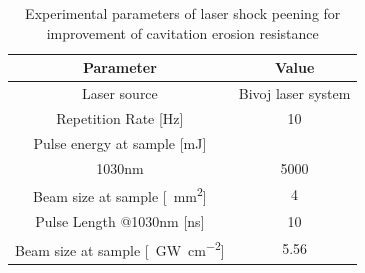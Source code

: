 \begin{table}[h!]
\centering
    \begin{threeparttable}
        \begin{tabular}{||c | c||} 
        \hline
            \textbf{Parameter} & \textbf{Value} \\ [0.5ex] 
        \hline\hline
        Laser source & Bivoj laser system  \\
        \hline
        Repetition Rate [Hz] & 10  \\ 
        \hline
            Pulse energy at sample [mJ] & \\
            1030nm & 5000 \\
        \hline
            Beam size at sample [\SI{}{\mm\squared}] & 4 \\
        \hline
            Pulse Length @1030nm [ns] & 10 \\
        \hline
            Beam size at sample [\SI{}{\giga\watt\per\cm\squared}] & 5.56 \\

        \hline
        \hline
        \end{tabular}

        \caption{Experimental parameters of laser shock peening for improvement of cavitation erosion resistance}
        \label{experimentalparameters}
    \end{threeparttable}
\end{table}

